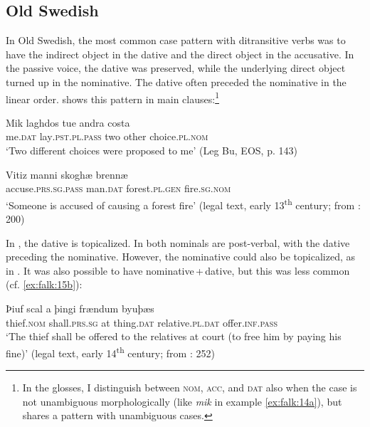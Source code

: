 \documentclass[output=paper]{langscibook}
\begin{document}
\subsection{Old Swedish}\label{sec:falk:3.3}


In Old Swedish, the most common case pattern with ditransitive verbs was to have the indirect object in the dative and the direct object in the accusative. In the passive voice, the dative was preserved, while the underlying direct object turned up in the nominative. The dative often preceded the nominative in the linear order.  shows this pattern in main clauses:\footnote{In the glosses, I distinguish between \textsc{nom,} \textsc{acc,} and \textsc{dat} also when the case is not unambiguous morphologically (like \textit{mik} in example \ref{ex:falk:14a}), but shares a pattern with unambiguous cases.}

\ea%
    \label{ex:falk:14}
\ea \label{ex:falk:14a}
\gll Mik    laghdos        tue  andra  costa\\
      me\textsc{.dat}  lay\textsc{.pst.pl.pass}  two  other    choice\textsc{.pl.nom}\\
\glt ‘Two different choices were proposed to me’ (Leg Bu, EOS, p. 143)

\ex \label{ex:falk:14b}
\gll Vitiz              manni    skoghæ      brennæ\\
      accuse\textsc{.prs.sg.pass}  man\textsc{.dat}  forest.\textsc{pl.gen}  fire.\textsc{sg.nom}\\
\glt ‘Someone is accused of causing a forest fire’ (legal text, early 13\textsuperscript{th} century; from \citealt{Holm1952}: 200)
\z
\z

In , the dative is topicalized. In  both nominals are post-verbal, with the dative preceding the nominative. However, the nominative could also be topicalized, as in . It was also possible to have nominative\,+\,dative, but this was less common (cf. \ref{ex:falk:15b}):

\ea%
    \label{ex:falk:15}
\ea \label{ex:falk:15a}
\gll Þiuf      scal          a  þingi    frændum        byuþæs\\
      thief.\textsc{nom}  shall.\textsc{prs.sg}  at  thing.\textsc{dat}  relative.\textsc{pl}.\textsc{dat}  offer.\textsc{inf.pass}\\
\glt ‘The thief shall be offered to the relatives at court (to free him by paying his fine)’ (legal text, early 14\textsuperscript{th} century; from \citealt{Holm1952}\textsc{:} \textsc{252)}
\end{document}
